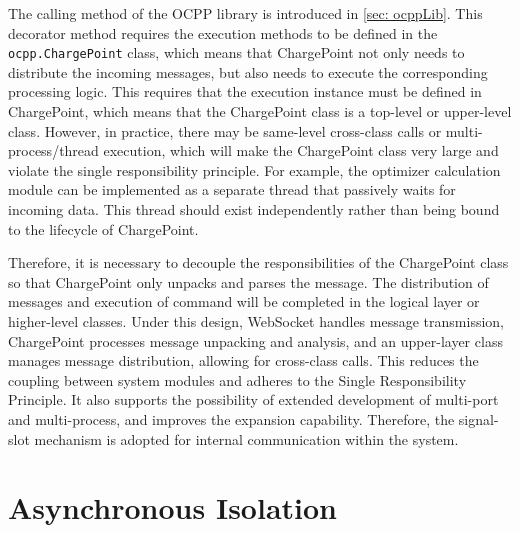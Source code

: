 \documentclass[
	english,
	ruledheaders=section,%
	class=report,%
	thesis={type=Report},%
	accentcolor=9c,%
	custommargins=true,%
	marginpar=false,%
	parskip=half-,%
	fontsize=11pt,%
	logofile={img/tuda_logo.pdf}, %
]{tudapub}
\begin{document}
The calling method of the \ac{OCPP} library is introduced in \autoref{sec: ocppLib}. This decorator method requires the execution methods to be defined in the \texttt{ocpp.ChargePoint} class, which means that ChargePoint not only needs to distribute the incoming messages, but also needs to execute the corresponding processing logic. This requires that the execution instance must be defined in ChargePoint, which means that the ChargePoint class is a top-level or upper-level class. However, in practice, there may be same-level cross-class calls or multi-process/thread execution, which will make the ChargePoint class very large and violate the single responsibility principle. For example, the optimizer calculation module can be implemented as a separate thread that passively waits for incoming data. This thread should exist independently rather than being bound to the lifecycle of ChargePoint. 

Therefore, it is necessary to decouple the responsibilities of the ChargePoint class so that ChargePoint only unpacks and parses the message. The distribution of messages and execution of command will be completed in the logical layer or higher-level classes. Under this design, WebSocket handles message transmission, ChargePoint processes message unpacking and analysis, and an upper-layer class manages message distribution, allowing for cross-class calls. This reduces the coupling between system modules and adheres to the Single Responsibility Principle. It also supports the possibility of extended development of multi-port and multi-process, and improves the expansion capability. Therefore, the signal-slot mechanism is adopted for internal communication within the system.

\section{Asynchronous Isolation}
\label{sec: asyncIsolation}

\end{document}

